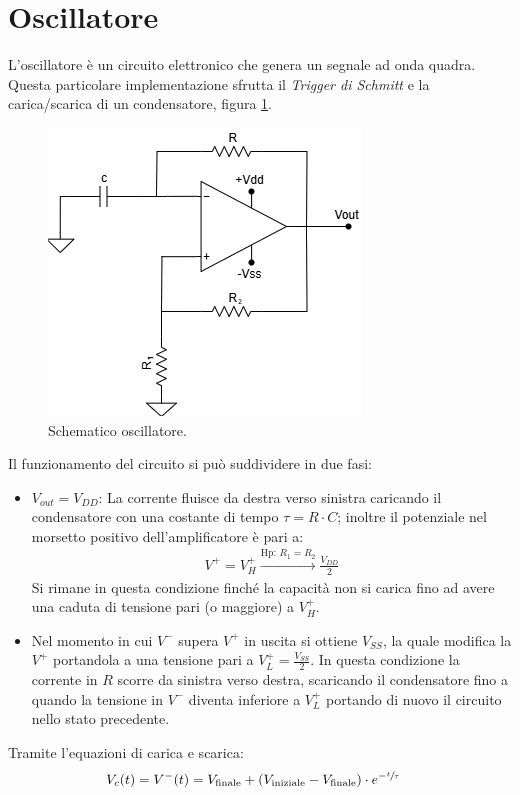 \documentclass[a4paper,12pt]{article}
\begin{document}
\section*{Oscillatore}
L'oscillatore è un circuito elettronico che genera un segnale ad onda quadra. Questa particolare implementazione sfrutta il \textit{Trigger di Schmitt} e la carica/scarica di un condensatore, figura \ref{fig:schematico_oscillatore}.
\begin{figure}
	\centering
	\includegraphics[width=0.5\linewidth]{immagini/oscillatore/circuito.png}
	\caption{Schematico oscillatore.}
	\label{fig:schematico_oscillatore}
\end{figure}
Il funzionamento del circuito si può suddividere in due fasi:
\begin{itemize}
	\item $V_{out} = V_{DD}$: La corrente fluisce da destra verso sinistra caricando il condensatore con una costante di tempo $\tau = R \cdot C$; inoltre il potenziale nel morsetto positivo dell'amplificatore è pari a:
	      \begin{align*}
		      V^+ = V^+_H \xrightarrow{\mathrm{Hp:}\,R_1 = R_2} \frac{V_{DD}}{2}
	      \end{align*}
	      Si rimane in questa condizione finché la capacità non si carica fino ad avere una caduta di tensione pari (o maggiore) a $V^+_H$.
	\item Nel momento in cui $V^-$ supera $V^+$ in uscita si ottiene $V_{SS}$, la quale modifica la $V^+$ portandola a una tensione pari a $V^+_L = \frac{V_{SS}}{2}$. In questa condizione la corrente in $R$ scorre da sinistra verso destra, scaricando il condensatore fino a quando la tensione in $V^-$ diventa inferiore a $V^+_L$ portando di nuovo il circuito nello stato precedente.
\end{itemize}
Tramite l'equazioni di carica e scarica:
\begin{align*}
	V_c (t) = V^- (t) & = V_{\text{finale}} + (V_{\text{iniziale}} - V_{\text{finale}} ) \cdot e^{-\sfrac{t}{\tau}}
\end{align*}
\end{document}
